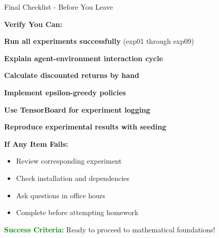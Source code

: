 \documentclass[aspectratio=169,10pt]{beamer}
\begin{document}
\begin{frame}{Final Checklist - Before You Leave}

\textbf{Verify You Can:}

\checkmark \textbf{Run all experiments successfully} (exp01 through exp09)

\checkmark \textbf{Explain agent-environment interaction cycle}

\checkmark \textbf{Calculate discounted returns by hand}

\checkmark \textbf{Implement epsilon-greedy policies}

\checkmark \textbf{Use TensorBoard for experiment logging}

\checkmark \textbf{Reproduce experimental results with seeding}

\vfill

\textbf{If Any Item Fails:}
\begin{itemize}
    \item Review corresponding experiment
    \item Check installation and dependencies
    \item Ask questions in office hours
    \item Complete before attempting homework
\end{itemize}

\vfill

\textcolor{green}{\textbf{Success Criteria:}} Ready to proceed to mathematical foundations!

\end{frame}
\end{document}
